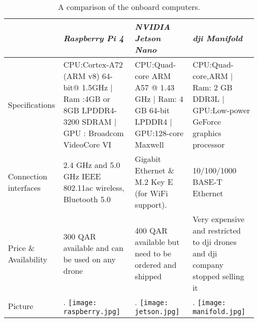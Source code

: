 \documentclass[../main.tex]{subfiles}
\begin{document}
\begin{table}[H]
    \centering
    \caption{A comparison of the onboard computers.}
    \label{tab:onboard-computers}  
    \begin{tabular}{ p{3cm} p{4cm} p{4cm} p{4cm} }
        \toprule
        \textit{} & \textit{Raspberry Pi 4} & \textit{NVIDIA Jetson Nano} & \textit{dji Manifold}\\ \midrule
        Specifications  & CPU:Cortex-A72 (ARM v8) 64-bit@ 1.5GHz | Ram :4GB or 8GB LPDDR4-3200 SDRAM | GPU : Broadcom VideoCore VI & CPU:Quad-core ARM A57 @ 1.43 GHz | Ram: 4 GB 64-bit LPDDR4   | GPU:128-core Maxwell & CPU:Quad-core,ARM | Ram: 2 GB DDR3L | GPU:Low-power GeForce graphics processor \\ \addlinespace
        Connection interfaces & 2.4 GHz and 5.0 GHz IEEE 802.11ac wireless, Bluetooth 5.0 & Gigabit Ethernet \& M.2 Key E (for WiFi support). &10/100/1000 BASE-T Ethernet \\ \addlinespace

        Price \& Availability & 300 QAR available and can be used on any drone & 400 QAR available but need to be ordered and shipped & Very expensive and restricted to dji drones and dji company stopped selling it \\ \addlinespace
        Picture & \begin{minipage}{.2\textwidth}.
            \texttt{[image: raspberry.jpg]}
            \end{minipage}  & \begin{minipage}{.2\textwidth}.
            \texttt{[image: jetson.jpg]}
            \end{minipage} & \begin{minipage}{.2\textwidth}.
            \texttt{[image: manifold.jpg]}
        \end{minipage} \\
        \bottomrule
        \end{tabular}
    \end{table}
    \newpage
\end{document}
